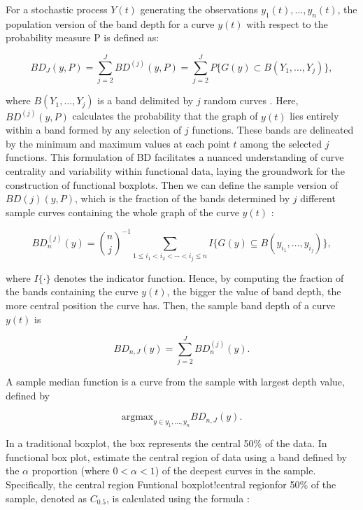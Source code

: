 \documentclass{article}\usepackage[]{graphicx}\usepackage[]{xcolor}
\numberwithin{equation}{section}
\begin{document}
\noindent
For a stochastic process $Y(t)$ generating the observations $y_1(t), \dots, y_n(t)$, the population version of the band depth for a curve $y(t)$ with respect to the probability measure P is defined as:

\begin{equation}
BD_{J}(y, P) = \sum_{j=2}^{J} BD^{(j)}(y,P)=\sum_{j=2}^{J} P\{G(y) \subset B(Y_1,\dots,Y_j)\}, 
\end{equation}

\noindent
where $B(Y_1,\dots,Y_j)$ is a band delimited by $j$ random curves \cite{SunGenton2011FunctionalBoxplots}. Here, $BD^{(j)}(y,P)$ calculates the probability that the graph of $y(t)$ lies entirely within a band formed by any selection of $j$ functions. These bands are delineated by the minimum and maximum values at each point $t$ among the selected $j$ functions. This formulation of BD facilitates a nuanced understanding of curve centrality and variability within functional data, laying the groundwork for the construction of functional boxplots. Then we can define the sample version of $BD(j)(y,P)$, which is the fraction of the bands determined by $j$ different sample curves containing the whole graph of the curve $y(t)$ \cite{SunGenton2011FunctionalBoxplots}:

\begin{equation}
BD_{n}^{(j)}(y) = {\binom{n}{j}}^{-1} \sum_{1 \leq i_1 < i_2 < \cdots < i_j \leq n} I\{G(y) \subseteq B(y_{i_1}, \ldots, y_{i_j})\}, 
\end{equation}

\noindent
where $I\{\cdot\}$ denotes the indicator function. Hence, by computing the fraction of the bands containing the curve $y(t)$, the bigger the value of band depth, the more central position the curve has. Then, the sample band depth of a curve $y(t)$ is \cite{SunGenton2011FunctionalBoxplots}

\begin{equation}
BD_{n,J}(y) = \sum_{j=2}^{J} BD^{(j)}_n (y).
\end{equation}

\noindent
A sample median function is a curve from the sample with largest depth value, defined by \cite{SunGenton2011FunctionalBoxplots} 

\begin{equation}
\text{argmax}_{y \in {y_1,\dots,y_n}} BD_{n,J}(y).
\end{equation}

\noindent
In a traditional boxplot, the box represents the central 50\% of the data.  In functional box plot, estimate the central region of data using a band defined by the $\alpha$ proportion (where $0 < \alpha < 1$) of the deepest curves in the sample. Specifically, the central region {Funtional boxplot!central region}for 50\% of the sample, denoted as $C_{0.5}$, is calculated using the formula \cite{SunGenton2011FunctionalBoxplots}:
\end{document}
